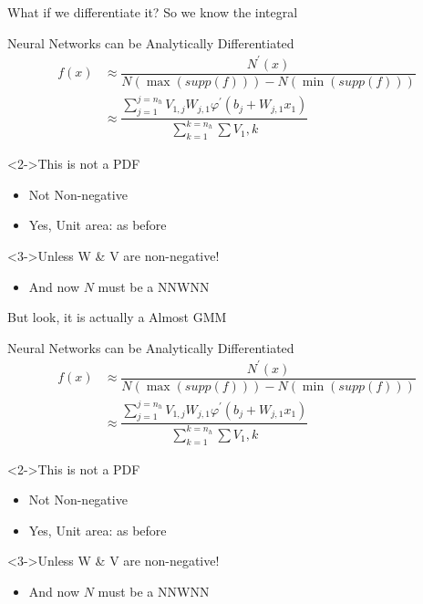 \documentclass[dvipsnames,handout]{beamer}
\renewcommand{\v}{\varphi}
\newcommand{\vp}{\v^\prime}
\begin{document}
\begin{frame}{What if we differentiate it? So we know the integral}
	\begin{block}{Neural Networks can be Analytically Differentiated}
		\begin{align*}
		f(x) &\approx \dfrac{N^\prime(x)}{N(\max(supp(f))) - N(\min(supp(f)))} \\
			 &\approx \dfrac{\sum_{j=1}^{j=n_h} V_{1,j}W_{j,1} \vp (b_j+W_{j,1}x_1)}{\sum_{k=1}^{k=n_h} \sum V_1,k}
		\end{align*}
	\end{block}
	\begin{block}<2->{This is not a PDF}
		\begin{itemize}
			\item Not Non-negative 
			\item Yes, Unit area: as before
		\end{itemize}
	\end{block}
	
	
	\begin{block}<3->{Unless W \& V are non-negative!}
		\begin{itemize}
			\item And now $N$ must be a NNWNN
		\end{itemize}
	\end{block}
\end{frame}

\begin{frame}{But look, it is actually a Almost GMM}
	\begin{block}{Neural Networks can be Analytically Differentiated}
		\begin{align*}
		f(x) &\approx \dfrac{N^\prime(x)}{N(\max(supp(f))) - N(\min(supp(f)))} \\
		&\approx \dfrac{\sum_{j=1}^{j=n_h} V_{1,j}W_{j,1} \vp (b_j+W_{j,1}x_1)}{\sum_{k=1}^{k=n_h} \sum V_1,k}
		\end{align*}
	\end{block}
	\begin{block}<2->{This is not a PDF}
		\begin{itemize}
			\item Not Non-negative 
			\item Yes, Unit area: as before
		\end{itemize}
	\end{block}
	
	
	\begin{block}<3->{Unless W \& V are non-negative!}
		\begin{itemize}
			\item And now $N$ must be a NNWNN
		\end{itemize}
	\end{block}
\end{frame}
\end{document}
